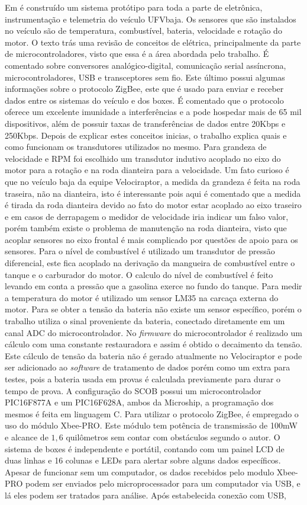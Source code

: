 Em  é construído um sistema protótipo para toda a parte de eletrônica, instrumentação e telemetria do veículo UFVbaja. Os sensores que são instalados no veículo são de temperatura, combustível, bateria, velocidade e rotação do motor. O texto trás uma revisão de conceitos de elétrica, principalmente da parte de microcontroladores, visto que essa é a área abordada pelo trabalho. É comentado sobre conversores analógico-digital, comunicação serial assíncrona, microcontroladores, USB e transceptores sem fio. Este último possui algumas informações sobre o protocolo ZigBee, este que é usado para enviar e receber dados entre os sistemas do veículo e dos boxes. É comentado que o protocolo oferece um excelente imunidade a interferências e a pode hospedar mais de 65 mil dispositivos, além de possuir taxas de transferências de dados entre 20Kbps e 250Kbps. Depois de explicar estes conceitos inicias, o trabalho explica quais e como funcionam os transdutores utilizados no mesmo. Para grandeza de velocidade e RPM foi escolhido um transdutor indutivo acoplado no eixo do motor para a rotação e na roda dianteira para a velocidade. Um fato curioso é que no veículo baja da equipe Velociraptor, a medida da grandeza é feita na roda traseira, não na dianteira, isto é interessante pois aqui é comentado que a medida é tirada da roda dianteira devido ao fato do motor estar acoplado ao eixo traseiro e em casos de derrapagem o medidor de velocidade iria indicar um falso valor, porém também existe o problema de manutenção na roda dianteira, visto que acoplar sensores no eixo frontal é mais complicado por questões de apoio para os sensores. Para o nível de combustível é utilizado um transdutor de pressão diferencial, este fica acoplado na derivação da mangueira de combustível entre o tanque e o carburador do motor. O calculo do nível de combustível é feito levando em conta a pressão que a gasolina exerce no fundo do tanque. Para medir a temperatura do motor é utilizado um sensor LM35 na carcaça externa do motor. Para se obter a tensão da bateria não existe um sensor específico, porém o trabalho utiliza o sinal proveniente da bateria, conectado diretamente em um canal ADC do microcontrolador. No \textit{firmware} do microcontrolador é realizado um cálculo com uma constante restauradora e assim é obtido o decaimento da tensão. Este cálculo de tensão da bateria não é gerado atualmente no Velociraptor e pode ser adicionado ao \textit{software} de tratamento de dados porém como um extra para testes, pois a bateria usada em provas é calculada previamente para durar o tempo de prova. A configuração do SCOB possui um microcontrolador PIC16F877A e um PIC16F628A, ambos da Microship, a programação dos mesmos é feita em linguagem C. Para utilizar o protocolo ZigBee, é empregado o uso do módulo Xbee-PRO. Este módulo tem potência de transmissão de 100mW e alcance de $1,6$ quilômetros sem contar com obstáculos segundo o autor. O sistema de boxes é independente e portátil, contando com um painel LCD de duas linhas e 16 colunas e LEDs para alertar sobre alguns dados específicos. Apesar de funcionar sem um computador, os dados recebidos pelo modulo Xbee-PRO podem ser enviados pelo microprocessador para um computador via USB, e lá eles podem ser tratados para análise. Após estabelecida conexão com USB, 